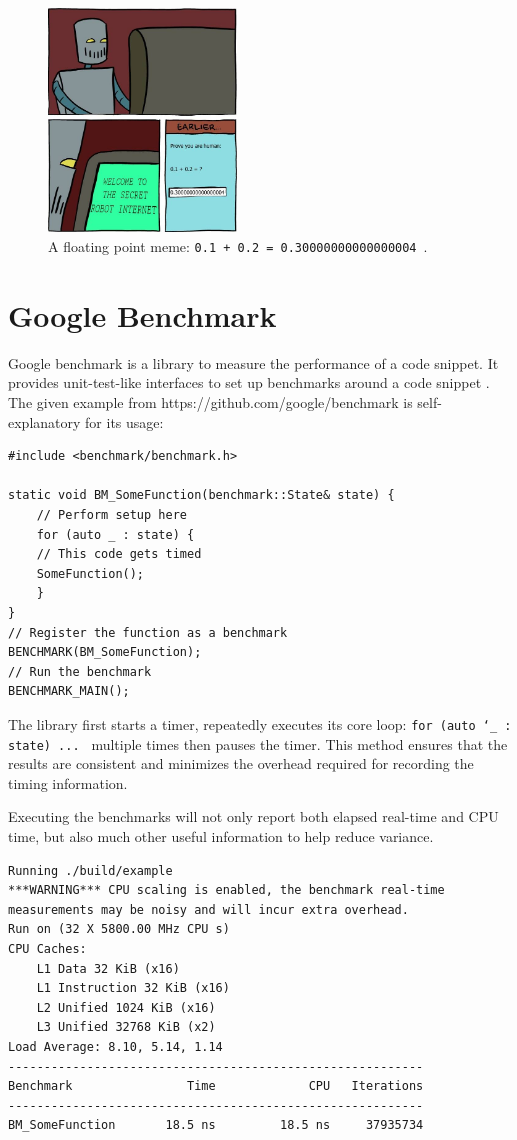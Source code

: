 \documentclass[logo,bsc,singlespacing,parskip]{infthesis}
\begin{document}
\begin{figure}
\begin{center}
    \includegraphics[width=50mm,scale=0.1]{image/0.3004.jpg}
    \caption{A floating point meme: \texttt{0.1 + 0.2 =
    0.30000000000000004}~\cite{meme}.}
    \label{meme}
\end{center}
\end{figure}

\section{Google Benchmark}
Google benchmark is a library to measure the performance of a code snippet. It
provides unit-test-like interfaces to set up benchmarks around a code snippet
\cite{googlebench}. The given example from https://github.com/google/benchmark
is self-explanatory for its usage: 

\begin{verbatim}
#include <benchmark/benchmark.h>

static void BM_SomeFunction(benchmark::State& state) {
    // Perform setup here
    for (auto _ : state) {
    // This code gets timed
    SomeFunction();
    }
}
// Register the function as a benchmark
BENCHMARK(BM_SomeFunction);
// Run the benchmark
BENCHMARK_MAIN();
\end{verbatim}

The library first starts a timer, repeatedly executes its core loop: \texttt{for
(auto \char`_ : state) ... } multiple times then pauses the timer. This method
ensures that the results are consistent and minimizes the overhead required for
recording the timing information. 

Executing the benchmarks will not only report both elapsed real-time and CPU
time, but also much other useful information to help reduce variance. 
\begin{verbatim}
Running ./build/example
***WARNING*** CPU scaling is enabled, the benchmark real-time 
measurements may be noisy and will incur extra overhead.
Run on (32 X 5800.00 MHz CPU s)
CPU Caches:
    L1 Data 32 KiB (x16)
    L1 Instruction 32 KiB (x16)
    L2 Unified 1024 KiB (x16)
    L3 Unified 32768 KiB (x2)
Load Average: 8.10, 5.14, 1.14
----------------------------------------------------------
Benchmark                Time             CPU   Iterations
----------------------------------------------------------
BM_SomeFunction       18.5 ns         18.5 ns     37935734
\end{verbatim}
\end{document}
